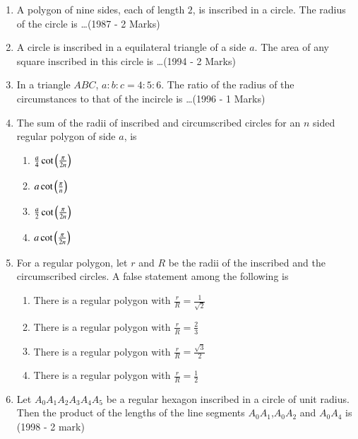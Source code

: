 \begin{enumerate}[label=\thesubsection.\arabic*,ref=\thesubsection.\theenumi]
    \item A polygon of nine sides, each of length $2$, is inscribed in a circle. The radius of the circle is \dots \hfill (1987 - 2 Marks) 
    \item A circle is inscribed in a equilateral triangle of a side $a$. The area of any square inscribed in this circle is \dots \hfill (1994 - 2 Marks)  
    \item In a triangle $ABC$, $a:b:c = 4:5:6$. The ratio of the radius of the circumstances to that of the incircle is \dots \hfill (1996 - 1 Marks) 
        \item The sum of the radii of inscribed and circumscribed circles for an $n$ sided regular polygon of side $a$, is \hfill{}
\begin{multicols}{4}
\begin{enumerate}
        \item $\frac{a}{4} \cot{\ensuremath{\left(\frac{\pi}{2n}\right)}}$         
        \item $ a \cot{\ensuremath{\left(\frac{\pi}{n}\right)}}$ 
        \item $\frac{a}{2} \cot{\ensuremath{\left(\frac{\pi}{2n}\right)}}$ 
        \item $ a \cot{\ensuremath{\left(\frac{\pi}{2n}\right)}}$
\end{enumerate}
\end{multicols}
\item For a regular polygon, let $r$ and $R$ be the radii of the inscribed and the circumscribed circles. A false statement among the following is \hfill{}
\begin{enumerate}
        \item There is a regular polygon with $\frac{r}{R}=\frac{1}{\sqrt{2}}$                    
        \item There is a regular polygon with $\frac{r}{R}=\frac{2}{3}$ 
        \item There is a regular polygon with $\frac{r}{R}=\frac{\sqrt{3}}{2}$ 
        \item There is a regular polygon with $\frac{r}{R}=\frac{1}{2}$
\end{enumerate}
    \item Let $A_{0}A_{1}A_{2}A_{3}A_{4}A_{5}$ be a regular hexagon inscribed in a circle of unit radius. Then the product of the lengths of the line segments $A_{0}A_{1}$,$A_{0}A_{2}$ and $A_{0}A_{4}$ is 
    \hfill{(1998 - 2 mark)}
    \begin{multicols}{2}

\end{multicols}
\end{enumerate}
